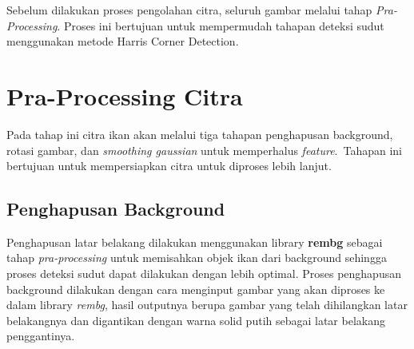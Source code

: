 Sebelum dilakukan proses pengolahan citra, seluruh gambar melalui tahap \emph{Pra-Processing}. 
Proses ini bertujuan untuk mempermudah tahapan deteksi sudut menggunakan metode Harris Corner Detection.

\section{Pra-Processing Citra}
    Pada tahap ini citra ikan akan melalui tiga tahapan penghapusan background, rotasi gambar, dan \emph{smoothing gaussian} untuk memperhalus \emph{feature}.~Tahapan ini bertujuan untuk mempersiapkan citra untuk diproses lebih lanjut.

\subsection{Penghapusan Background}


    Penghapusan latar belakang dilakukan menggunakan library \textbf{rembg} sebagai tahap \emph{pra-processing} untuk memisahkan objek ikan dari background sehingga proses deteksi sudut dapat dilakukan dengan lebih optimal. 
Proses penghapusan background dilakukan dengan cara menginput gambar yang akan diproses ke dalam library \emph{rembg}, hasil outputnya berupa gambar yang telah dihilangkan latar belakangnya dan digantikan dengan warna solid putih sebagai latar belakang penggantinya.



